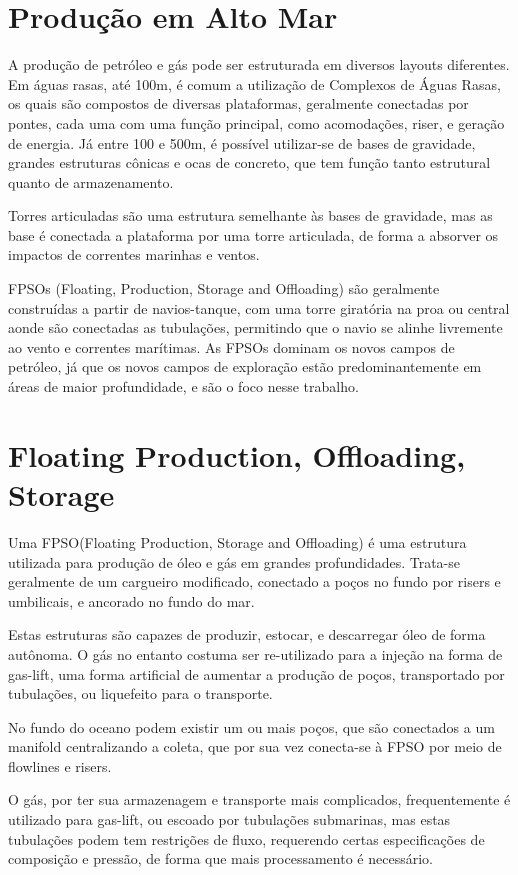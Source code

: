 \section{Produção em Alto Mar}

A produção de petróleo e gás pode ser estruturada em diversos layouts diferentes.
% 
Em águas rasas, até 100m, é comum a utilização de Complexos de Águas Rasas, os quais são compostos de diversas plataformas, geralmente conectadas por pontes, cada uma com uma função principal, como acomodações, riser, e geração de energia.
%
Já entre 100 e 500m, é possível utilizar-se de bases de gravidade, grandes estruturas cônicas e ocas de concreto, que tem função tanto estrutural quanto de armazenamento. 
%

Torres articuladas são uma estrutura semelhante às bases de gravidade, mas as base é conectada a plataforma por uma torre articulada, de forma a absorver os impactos de correntes marinhas e ventos.
%

FPSOs (Floating, Production, Storage and Offloading) são geralmente construídas a partir de navios-tanque, com uma torre giratória na proa ou central aonde são conectadas as tubulações, permitindo que o navio se alinhe livremente ao vento e correntes marítimas. 
%
As FPSOs dominam os novos campos de petróleo, já que os novos campos de exploração estão predominantemente em áreas de maior profundidade, e são o foco nesse trabalho.

\section{Floating Production, Offloading, Storage}
Uma FPSO(Floating Production, Storage and Offloading) é uma estrutura utilizada para produção de óleo e gás em grandes profundidades. Trata-se geralmente de um cargueiro modificado, conectado a poços no fundo por risers e umbilicais, e ancorado no fundo do mar.

Estas estruturas são capazes de produzir, estocar, e descarregar óleo de forma autônoma. O gás no entanto costuma ser re-utilizado para a injeção na forma de gas-lift, uma forma artificial de aumentar a produção de poços, transportado por tubulações, ou liquefeito para o transporte.

No fundo do oceano podem existir um ou mais poços, que são conectados a um manifold centralizando a coleta, que por sua vez conecta-se à FPSO por meio de flowlines e risers.

O gás, por ter sua armazenagem e transporte mais complicados, frequentemente é utilizado para gas-lift, ou escoado por tubulações submarinas, mas estas tubulações podem tem restrições de fluxo, requerendo certas especificações de composição e pressão, de forma que mais processamento é necessário.


